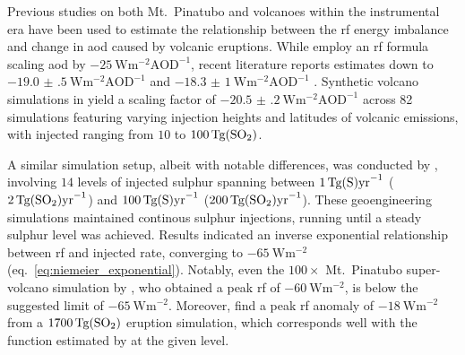 \documentclass{ametsocV6.1}
\newcommand{\iso}[1][i]{{#1}njected \ce{SO2}}
\begin{document}
Previous studies on both Mt.\ Pinatubo \citep{mills2017,hansen2005} and volcanoes within
the instrumental era \citep{gregory2016} have been used to estimate the relationship
between the \gls{rf} energy imbalance and change in \gls{aod} caused by volcanic
eruptions. While \citet{myhre2013} employ an \gls{rf} formula scaling \gls{aod} by
\(\SI{-25}{\watt\metre^{-2}\mathrm{AOD}^{-1}}\), recent literature reports estimates
down to \(\SI{-19.0(5)}{\watt\metre^{-2}\mathrm{AOD}^{-1}}\) \citep{gregory2016} and
\(\SI{-18.3(10)}{\watt\metre^{-2}\mathrm{AOD}^{-1}}\) \citep{mills2017}. Synthetic
volcano simulations in \citet{marshall2020} yield a scaling factor of
\(\SI{-20.5(2)}{\watt\metre^{-2}\mathrm{AOD}^{-1}}\) across 82 simulations featuring
varying injection heights and latitudes of volcanic emissions, with \iso{} ranging from
\(10\) to \(\SI{100}{\tera\gram(\ce{SO2})}\).

A similar simulation setup, albeit with notable differences, was conducted by
\citet{niemeier2015}, involving \(14\) levels of injected sulphur spanning between
\(\SI{1}{\tera\gram(\ce{S})\mathrm{yr}^{-1}}\)
(\(\SI{2}{\tera\gram(\ce{SO2})\mathrm{yr}^{-1}}\)) and
\(\SI{100}{\tera\gram(\ce{S})\mathrm{yr}^{-1}}\)
(\(\SI{200}{\tera\gram(\ce{SO2})\mathrm{yr}^{-1}}\)). These geoengineering simulations
maintained continous sulphur injections, running until a steady sulphur level was
achieved. Results indicated an inverse exponential relationship between \gls{rf} and
\iso{} rate, converging to \(\SI{-65}{\watt\metre^{-2}}\)
(eq.~\ref{eq:niemeier_exponential}). Notably, even the \(100\times\) Mt.\ Pinatubo
super-volcano simulation by \citet{jones2005}, who obtained a peak \gls{rf} of
\(\SI{-60}{\watt\metre^{-2}}\), is below the suggested limit of
\(\SI{-65}{\watt\metre^{-2}}\). Moreover, \citet{timmreck2010} find a peak \gls{rf}
anomaly of \(\SI{-18}{\watt\metre^{-2}}\) from a \(\SI{1700}{\tera\gram(\ce{SO2})}\)
eruption simulation, which corresponds well with the function estimated by
\citet{niemeier2015} at the given  level.
\end{document}
